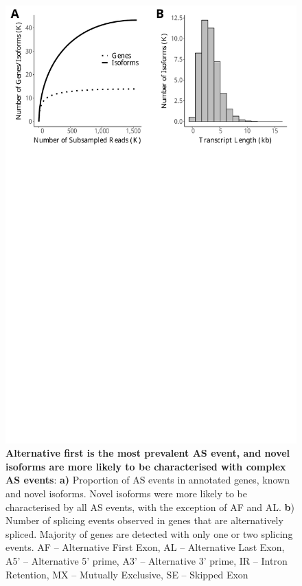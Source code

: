 \vspace{1cm}
\begin{figure}[!h]
	\begin{center}
		\includegraphics[page=5,trim={0 26cm 0 0},clip,scale = 0.55]{Figures/IsoSeqWholeTranscriptome.pdf}
	\end{center}
	\captionsetup{width=0.95\textwidth}
	\caption[Number of Alternative Splicing Events in Whole Transcriptome Iso-Seq]%
	{\textbf{Alternative first is the most prevalent AS event, and novel isoforms are more likely to be characterised with complex AS events}: \textbf{a)} Proportion of AS events in annotated genes, known and novel isoforms. Novel isoforms were more likely to be characterised by all AS events, with the exception of AF and AL. \textbf{b}) Number of splicing events observed in genes that are alternatively spliced. Majority of genes are detected with only one or two splicing events. AF – Alternative First Exon, AL – Alternative Last Exon, A5’ – Alternative 5’ prime, A3’ – Alternative 3’ prime, IR – Intron Retention, MX – Mutually Exclusive, SE – Skipped Exon}
	\label{fig:isoseq_whole_As_events}
\end{figure}

